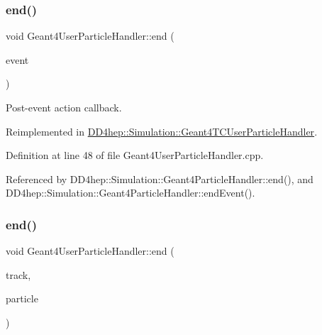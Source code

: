 \subsubsection{\texorpdfstring{end()}{end()}\hspace{0.1cm}{\footnotesize\ttfamily [1/2]}}
{\footnotesize\ttfamily void Geant4\+User\+Particle\+Handler\+::end (\begin{DoxyParamCaption}\item[{const G4\+Event $\ast$}]{event }\end{DoxyParamCaption})\hspace{0.3cm}{\ttfamily [virtual]}}



Post-\/event action callback. 



Reimplemented in \hyperlink{class_d_d4hep_1_1_simulation_1_1_geant4_t_c_user_particle_handler_ac51009a6e712d2b52d2470a5a1a7a03d}{D\+D4hep\+::\+Simulation\+::\+Geant4\+T\+C\+User\+Particle\+Handler}.



Definition at line 48 of file Geant4\+User\+Particle\+Handler.\+cpp.



Referenced by D\+D4hep\+::\+Simulation\+::\+Geant4\+Particle\+Handler\+::end(), and D\+D4hep\+::\+Simulation\+::\+Geant4\+Particle\+Handler\+::end\+Event().

\hypertarget{class_d_d4hep_1_1_simulation_1_1_geant4_user_particle_handler_a327d267d834a00157ebd0b1e99e1685c}{}\label{class_d_d4hep_1_1_simulation_1_1_geant4_user_particle_handler_a327d267d834a00157ebd0b1e99e1685c} 
\subsubsection{\texorpdfstring{end()}{end()}\hspace{0.1cm}{\footnotesize\ttfamily [2/2]}}
{\footnotesize\ttfamily void Geant4\+User\+Particle\+Handler\+::end (\begin{DoxyParamCaption}\item[{const G4\+Track $\ast$}]{track,  }\item[{\hyperlink{class_d_d4hep_1_1_simulation_1_1_geant4_user_particle_handler_a0222f326d539ff27c6c446a7a30e8e26}{Particle} \&}]{particle }\end{DoxyParamCaption})\hspace{0.3cm}{\ttfamily [virtual]}}




